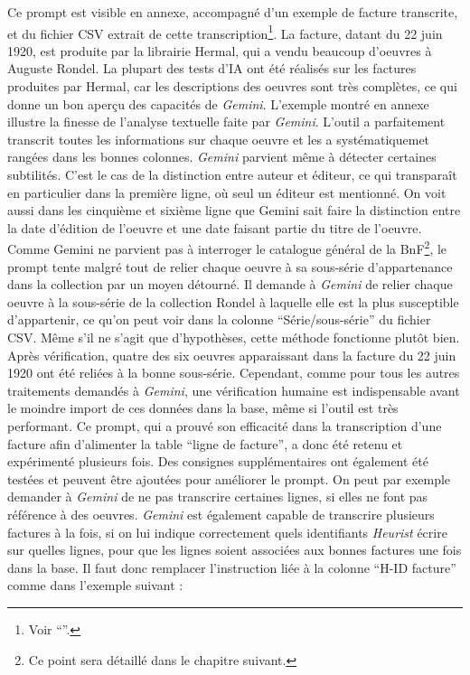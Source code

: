 Ce prompt est visible en annexe, accompagné d'un exemple de facture transcrite, et du fichier CSV extrait de cette transcription\footnote{Voir \enquote{}.}. La facture, datant du 22 juin 1920, est produite par la librairie Hermal, qui a vendu beaucoup d'oeuvres à Auguste Rondel. La plupart des tests d'IA ont été réalisés sur les factures produites par Hermal, car les descriptions des oeuvres sont très complètes, ce qui donne un bon aperçu des capacités de \emph{Gemini}. L'exemple montré en annexe illustre la finesse de l'analyse textuelle faite par \emph{Gemini}. L'outil a parfaitement transcrit toutes les informations sur chaque oeuvre et les a systématiquemet rangées dans les bonnes colonnes. \emph{Gemini} parvient même à détecter certaines subtilités. C'est le cas de la distinction entre auteur et éditeur, ce qui transparaît en particulier dans la première ligne, où seul un éditeur est mentionné. On voit aussi dans les cinquième et sixième ligne que Gemini sait faire la distinction entre la date d'édition de l'oeuvre et une date faisant partie du titre de l'oeuvre. Comme Gemini ne parvient pas à interroger le catalogue général de la BnF\footnote{Ce point sera détaillé dans le chapitre suivant.}, le prompt tente malgré tout de relier chaque oeuvre à sa sous-série d'appartenance dans la collection par un moyen détourné. Il demande à \emph{Gemini} de relier chaque oeuvre à la sous-série de la collection Rondel à laquelle elle est la plus susceptible d'appartenir, ce qu'on peut voir dans la colonne \enquote{Série/sous-série} du fichier CSV. Même s'il ne s'agit que d'hypothèses, cette méthode fonctionne plutôt bien. Après vérification, quatre des six oeuvres apparaissant dans la facture du 22 juin 1920 ont été reliées à la bonne sous-série. Cependant, comme pour tous les autres traitements demandés à \emph{Gemini}, une vérification humaine est indispensable avant le moindre import de ces données dans la base, même si l'outil est très performant. Ce prompt, qui a prouvé son efficacité dans la transcription d'une facture afin d'alimenter la table \enquote{ligne de facture}, a donc été retenu et expérimenté plusieurs fois. Des consignes supplémentaires ont également été testées et peuvent être ajoutées pour améliorer le prompt. On peut par exemple demander à \emph{Gemini} de ne pas transcrire certaines lignes, si elles ne font pas référence à des oeuvres. \emph{Gemini} est également capable de transcrire plusieurs factures à la fois, si on lui indique correctement quels identifiants \emph{Heurist} écrire sur quelles lignes, pour que les lignes soient associées aux bonnes factures une fois dans la base. Il faut donc remplacer l'instruction liée à la colonne \enquote{H-ID facture} comme dans l'exemple suivant : 

